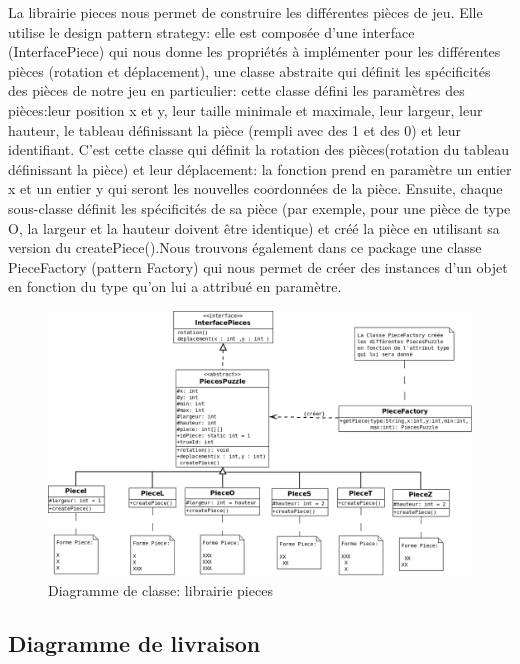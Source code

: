 \documentclass[12pt]{article}
\begin{document}
La librairie pieces nous permet de construire les différentes pièces de jeu. Elle utilise le design pattern strategy: elle est composée d'une interface (InterfacePiece) qui nous donne les propriétés à implémenter pour les différentes pièces (rotation et déplacement), une classe abstraite qui définit les spécificités des pièces de notre jeu en particulier: cette classe défini les paramètres des pièces:leur position x et y, leur taille minimale et maximale, leur largeur, leur hauteur, le tableau définissant la pièce (rempli avec des 1 et des 0) et leur identifiant. C'est cette classe qui définit la rotation des pièces(rotation du tableau définissant la pièce) et leur déplacement: la fonction prend en paramètre un entier x et un entier y qui seront les nouvelles coordonnées de la pièce. Ensuite, chaque sous-classe définit les spécificités de sa pièce (par exemple, pour une pièce de type O, la largeur et la hauteur doivent être identique) et créé la pièce en utilisant sa version du createPiece().Nous trouvons également dans ce package une classe PieceFactory (pattern Factory) qui nous permet de créer des instances d'un objet en fonction du type qu'on lui a attribué en paramètre.


\begin{figure}[h]
\begin{center}
\includegraphics[scale=0.22]{Images/libPiece.png}
\end{center}
\caption{Diagramme de classe: librairie pieces}
\end{figure}

\subsection{Diagramme de livraison}
\end{document}
